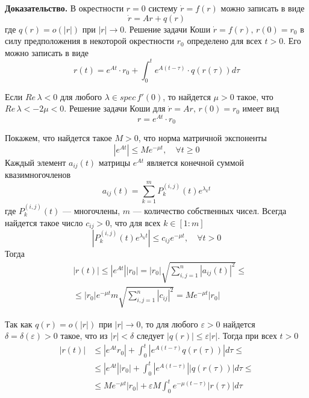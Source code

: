 \noindent \textbf{Доказательство.} В окрестности $r = 0$ систему $\dot{r} = f(r)$ можно записать в виде
\begin{equation*}
    \dot{r} = Ar + q(r)
\end{equation*}
где $q(r) = o(|r|)$ при $|r| \to 0$. Решение задачи Коши $\dot{r} = f(r),\, r(0) = r_0$ в силу предположения в некоторой окрестности $r_0$ определено для всех $t > 0$. Его можно записать в виде
\begin{equation*}
    r(t) = e^{At}\cdot r_0 + \int_0^t e^{A(t-\tau)}\cdot q(r(\tau))d\tau
\end{equation*}

Если $Re\, \lambda < 0$ для любого $\lambda \in spec\, f'(0)$, то найдется $\mu > 0$ такое, что $Re\, \lambda < -2\mu < 0$. Решение задачи Коши для $\dot{r} = Ar,\, r(0) = r_0$ имеет вид
\begin{equation*}
    r = e^{At}\cdot r_0
\end{equation*}

Покажем, что найдется такое $M > 0$, что норма матричной экспоненты
\begin{equation*}
    |e^{At}| \le Me^{-\mu t}, \quad \forall t \ge 0
\end{equation*}
Каждый элемент $a_{ij}(t)$ матрицы $e^{At}$ является конечной суммой квазимногочленов
\begin{equation*}
    a_{ij}(t) = \sum_{k=1}^m P_k^{(i,j)}(t) e^{\lambda_kt}
\end{equation*}
где $P_k^{(i,j)}(t)$ --- многочлены, $m$ --- количество собственных чисел. Всегда найдется такое число $c_{ij} > 0$, что для всех $k \in [1:m]$
\begin{equation*}
    |P_k^{(i,j)}(t)e^{\lambda_kt}| \le c_{ij}e^{-\mu t}, \quad \forall t > 0
\end{equation*}
Тогда
\begin{equation*}
    \begin{aligned}
         & |r(t)| \le |e^{At}| |r_0| = |r_0| \sqrt{\sum_{i,j=1}^n |a_{ij}(t)|^2} \le  \\
         & \le |r_0| e^{-\mu t}m \sqrt{\sum_{i,j=1}^n |c_{ij}|^2} = Me^{-\mu t} |r_0|
    \end{aligned}
\end{equation*}

Так как $q(r) = o(|r|)$ при $|r| \to 0$, то для любого $\varepsilon > 0$ найдется $\delta = \delta(\varepsilon) > 0$ такое, что из $|r| < \delta$ следует $|q(r)| \le \varepsilon|r|$. Тогда при всех $t > 0$
\begin{equation*}
    \begin{aligned}
        |r(t)| & \le |e^{At} r_0| + \int_0^t |e^{A(t - \tau)} q(r(\tau))|d\tau \le               \\
               & \le |e^{At}| |r_0| + \int_0^t |e^{A(t - \tau)}| |q(r(\tau))|d\tau \le           \\
               & \le Me^{-\mu t} |r_0| + \varepsilon M\int_0^t e^{-\mu (t - \tau)}|r(\tau)|d\tau
    \end{aligned}
\end{equation*}

